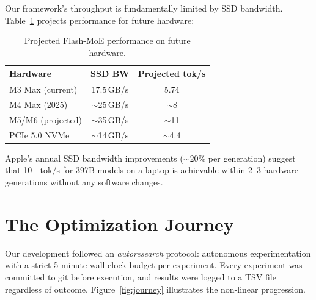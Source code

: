 \documentclass[11pt,twocolumn]{article}
\begin{document}
Our framework's throughput is fundamentally limited by SSD bandwidth.
Table~\ref{tab:scaling} projects performance for future hardware:

\begin{table}[t]
\centering
\small
\caption{Projected Flash-MoE performance on future hardware.}
\label{tab:scaling}
\begin{tabular}{@{}lcc@{}}
\toprule
\textbf{Hardware} & \textbf{SSD BW} & \textbf{Projected tok/s} \\
\midrule
M3 Max (current) & 17.5\,GB/s & 5.74 \\
M4 Max (2025) & $\sim$25\,GB/s & $\sim$8 \\
M5/M6 (projected) & $\sim$35\,GB/s & $\sim$11 \\
PCIe 5.0 NVMe & $\sim$14\,GB/s & $\sim$4.4 \\
\bottomrule
\end{tabular}
\end{table}

Apple's annual SSD bandwidth improvements ($\sim$20\% per generation) suggest that 10+\,tok/s for 397B models on a laptop is achievable within 2--3 hardware generations without any software changes.

\section{The Optimization Journey}

Our development followed an \emph{autoresearch} protocol: autonomous experimentation with a strict 5-minute wall-clock budget per experiment.
Every experiment was committed to git before execution, and results were logged to a TSV file regardless of outcome.
Figure~\ref{fig:journey} illustrates the non-linear progression.
\end{document}

